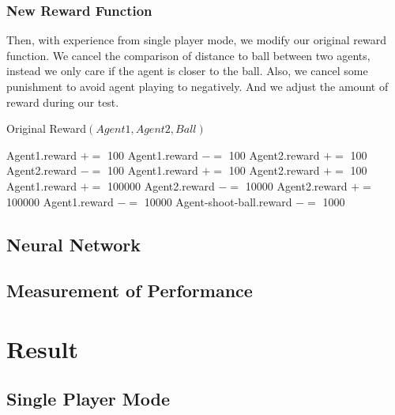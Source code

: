 \documentclass[14pt]{extarticle}
\begin{document}
\subsubsection{New Reward Function}
Then, with experience from single player mode, we modify our original reward function. We cancel the comparison of distance to ball between two agents, instead we only care if the agent is closer to the ball. Also, we cancel some punishment to avoid agent playing to negatively. And we adjust the amount of reward during our test.
\begin{algorithm}[!h]
	\caption{Original Reward$(Agent1,Agent2,Ball)$}
	\begin{algorithmic}
		\State Agent1.reward $+=$ 100
		\Else
		\State Agent1.reward $-=$ 100
		\EndIf
		\State Agent2.reward $+=$ 100
		\Else
		\State Agent2.reward $-=$ 100
		\EndIf
		\State Agent1.reward $+=$ 100
		\EndIf
		\State Agent2.reward $+=$ 100
		\EndIf
		\State Agent1.reward $+=$ 100000
		\State Agent2.reward $-=$ 10000
		\EndIf
		\State Agent2.reward $+=$ 100000
		\State Agent1.reward $-=$ 10000
		\EndIf
		\State Agent-shoot-ball.reward $-=$ 1000
		\EndIf
	\end{algorithmic}
\end{algorithm}

\subsection{Neural Network}

\subsection{Measurement of Performance}



\section{Result}

\subsection{Single Player Mode}
\end{document}
